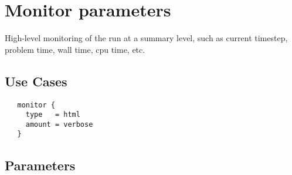 \section{Monitor parameters} \label{s:monitor}

High-level monitoring of the run at a summary level, such as current
timestep, problem time, wall time, cpu time, etc.

\subsection{Use Cases}
\begin{verbatim}
   monitor {
     type   = html
     amount = verbose
   }
\end{verbatim}
\subsection{Parameters}
